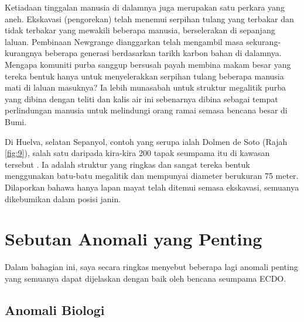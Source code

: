 \documentclass[10pt,twocolumn,letterpaper]{article}
\begin{document}
Ketiadaan tinggalan manusia di dalamnya juga merupakan satu perkara yang aneh. Ekskavasi (pengorekan) telah menemui serpihan tulang yang terbakar dan tidak terbakar yang mewakili beberapa manusia, berselerakan di sepanjang laluan. Pembinaan Newgrange dianggarkan telah mengambil masa sekurang-kurangnya beberapa generasi berdasarkan tarikh karbon bahan di dalamnya. Mengapa komuniti purba sanggup bersusah payah membina makam besar yang tereka bentuk hanya untuk menyelerakkan serpihan tulang beberapa manusia mati di laluan masuknya? Ia lebih munasabah untuk struktur megalitik purba yang dibina dengan teliti dan kalis air ini sebenarnya dibina sebagai tempat perlindungan manusia untuk melindungi orang ramai semasa bencana besar di Bumi.

Di Huelva, selatan Sepanyol, contoh yang serupa ialah Dolmen de Soto (Rajah \ref{fig:9}), salah satu daripada kira-kira 200 tapak seumpama itu di kawasan tersebut \cite{72,32}. Ia adalah struktur yang ringkas dan sangat tereka bentuk menggunakan batu-batu megalitik dan mempunyai diameter berukuran 75 meter. Dilaporkan bahawa hanya lapan mayat telah ditemui semasa ekskavasi, semuanya dikebumikan dalam posisi janin.

\section{Sebutan Anomali yang Penting}

Dalam bahagian ini, saya secara ringkas menyebut beberapa lagi anomali penting yang semuanya dapat dijelaskan dengan baik oleh bencana seumpama ECDO.

\subsection{Anomali Biologi}
\end{document}
